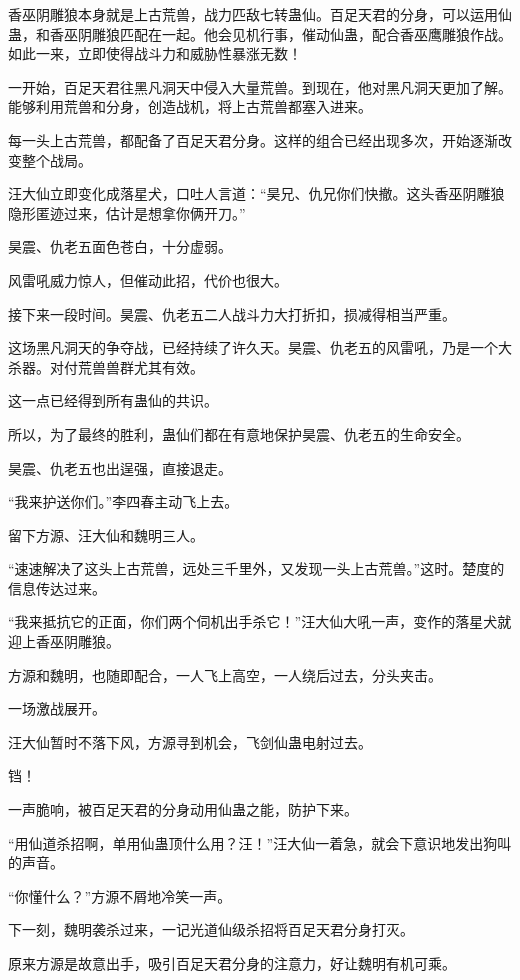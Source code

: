 \begin{this_body}
香巫阴雕狼本身就是上古荒兽，战力匹敌七转蛊仙。百足天君的分身，可以运用仙蛊，和香巫阴雕狼匹配在一起。他会见机行事，催动仙蛊，配合香巫鹰雕狼作战。如此一来，立即使得战斗力和威胁性暴涨无数！

一开始，百足天君往黑凡洞天中侵入大量荒兽。到现在，他对黑凡洞天更加了解。能够利用荒兽和分身，创造战机，将上古荒兽都塞入进来。

每一头上古荒兽，都配备了百足天君分身。这样的组合已经出现多次，开始逐渐改变整个战局。

汪大仙立即变化成落星犬，口吐人言道：“昊兄、仇兄你们快撤。这头香巫阴雕狼隐形匿迹过来，估计是想拿你俩开刀。”

昊震、仇老五面色苍白，十分虚弱。

风雷吼威力惊人，但催动此招，代价也很大。

接下来一段时间。昊震、仇老五二人战斗力大打折扣，损减得相当严重。

这场黑凡洞天的争夺战，已经持续了许久天。昊震、仇老五的风雷吼，乃是一个大杀器。对付荒兽兽群尤其有效。

这一点已经得到所有蛊仙的共识。

所以，为了最终的胜利，蛊仙们都在有意地保护昊震、仇老五的生命安全。

昊震、仇老五也出逞强，直接退走。

“我来护送你们。”李四春主动飞上去。

留下方源、汪大仙和魏明三人。

“速速解决了这头上古荒兽，远处三千里外，又发现一头上古荒兽。”这时。楚度的信息传达过来。

“我来抵抗它的正面，你们两个伺机出手杀它！”汪大仙大吼一声，变作的落星犬就迎上香巫阴雕狼。

方源和魏明，也随即配合，一人飞上高空，一人绕后过去，分头夹击。

一场激战展开。

汪大仙暂时不落下风，方源寻到机会，飞剑仙蛊电射过去。

铛！

一声脆响，被百足天君的分身动用仙蛊之能，防护下来。

“用仙道杀招啊，单用仙蛊顶什么用？汪！”汪大仙一着急，就会下意识地发出狗叫的声音。

“你懂什么？”方源不屑地冷笑一声。

下一刻，魏明袭杀过来，一记光道仙级杀招将百足天君分身打灭。

原来方源是故意出手，吸引百足天君分身的注意力，好让魏明有机可乘。


\end{this_body}
